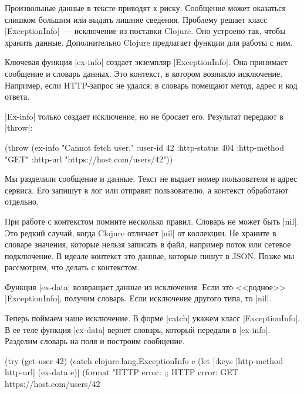 Произвольные данные в тексте приводят к риску. Сообщение может оказаться слишком
большим или выдать лишние сведения. Проблему решает класс
\spverb|ExceptionInfo|~--- исключение из поставки Clojure. Оно устроено так,
чтобы хранить данные. Дополнительно Clojure предлагает функции для работы с ним.

Ключевая функция \spverb|ex-info| создает экземпляр \spverb|ExceptionInfo|. Она
принимает сообщение и словарь данных. Это контекст, в котором возникло
исключение. Например, если HTTP-запрос не удался, в словарь помещают метод,
адрес и код ответа.

\spverb|Ex-info| только создает исключение, но не бросает его. Результат
передают в \spverb|throw|:

\begin{english}
  \begin{clojure}
(throw (ex-info
        "Cannot fetch user."
        {:user-id 42
         :http-status 404
         :http-method "GET"
         :http-url "https://host.com/users/42"}))
  \end{clojure}
\end{english}

Мы разделили сообщение и данные. Текст не выдает номер пользователя и адрес
сервиса. Его запишут в лог или отправят пользователю, а контекст обработают
отдельно.

При работе с контекстом помните несколько правил. Словарь не может быть
\spverb|nil|. Это редкий случай, когда Clojure отличает \spverb|nil| от
коллекции. Не храните в словаре значения, которые нельзя записать в файл,
например поток или сетевое подключение. В идеале контекст это данные, которые
пишут в JSON. Позже мы рассмотрим, что делать с контекстом.

Функция \spverb|ex-data| возвращает данные из исключения. Если это <<родное>>
\spverb|ExceptionInfo|, получим словарь. Если исключение другого типа, то
\spverb|nil|.

Теперь поймаем наше исключение. В форме \spverb|catch| укажем класс
\spverb|ExceptionInfo|. В ее теле функция \spverb|ex-data| вернет словарь,
который передали в \spverb|ex-info|. Разделим словарь на поля и построим
сообщение.

\begin{english}
  \begin{clojure}
(try
  (get-user 42)
  (catch clojure.lang.ExceptionInfo e
    (let [{:keys [http-method http-url]} (ex-data e)]
      (format "HTTP error: %
;; HTTP error: GET https://host.com/users/42
  \end{clojure}
\end{english}

